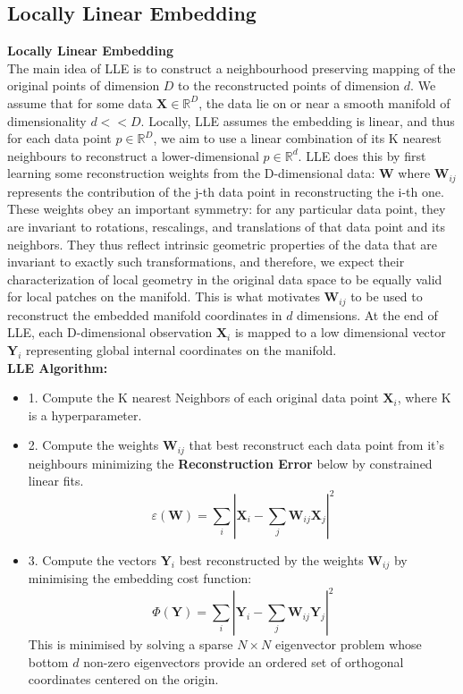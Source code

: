 \documentclass[12pt]{report}
\begin{document}
\newpage

\subsection{Locally Linear Embedding}

\textbf{Locally Linear Embedding}
\\
The main idea of LLE is to construct a neighbourhood preserving mapping 
of the original points of dimension $D$ to the reconstructed points of dimension $d$. 
We assume that for some data $\textbf{X} \in \mathbb{R}^{D}$, 
the data lie on or near a smooth manifold of dimensionality $d << D$. 
Locally, LLE assumes the embedding is linear, and thus for each data point $p \in \mathbb{R}^D$, 
we aim to use a linear combination of its K nearest neighbours to reconstruct a lower-dimensional $p \in \mathbb{R}^d$. 
LLE does this by first learning some reconstruction weights from the D-dimensional data: $\textbf{W}$ 
where $\textbf{W}_{ij}$ represents the contribution of the j-th data point in reconstructing the i-th one. 
These weights obey an important symmetry: for any particular data point, 
they are invariant to rotations, rescalings, and translations of that data point and its neighbors.
They thus reflect intrinsic geometric properties of the data that are invariant to exactly such transformations,
and therefore, we expect their characterization of local geometry in the 
original data space to be equally valid for local patches on the manifold.
This is what motivates $\textbf{W}_{ij}$ to be used to reconstruct
the embedded manifold coordinates in $d$ dimensions. 
At the end of LLE, each  D-dimensional observation $\textbf{X}_i$ 
is mapped to a low dimensional vector $\textbf{Y}_i$ 
representing global internal coordinates on the manifold.\\
\textbf{LLE Algorithm:}
\begin{itemize}
    \item 1. Compute the K nearest Neighbors of each original data point 
    $\textbf{X}_i$, where K is a hyperparameter.
    \item 2. Compute the weights $\textbf{W}_{ij}$ that best 
    reconstruct each data point from it's neighbours 
    minimizing the \textbf{Reconstruction Error} below by constrained linear fits.
$$\varepsilon (\textbf{W}) = \sum_i|\textbf{X}_i - \sum_j \textbf{W}_{ij} \textbf{X}_j|^2$$
    \item 3. Compute the vectors $\textbf{Y}_i$ best reconstructed by the weights $\textbf{W}_{ij}$ 
    by minimising the embedding cost function: 
    $$\Phi(\textbf{Y}) = \sum_i |\textbf{Y}_i - \sum_j \textbf{W}_{ij}\textbf{Y}_j|^2$$
    This is minimised by solving a sparse $N \times N$ 
    eigenvector problem whose bottom $d$ non-zero eigenvectors provide
    an ordered set of orthogonal coordinates centered on the origin.
\end{itemize}
\end{document}
